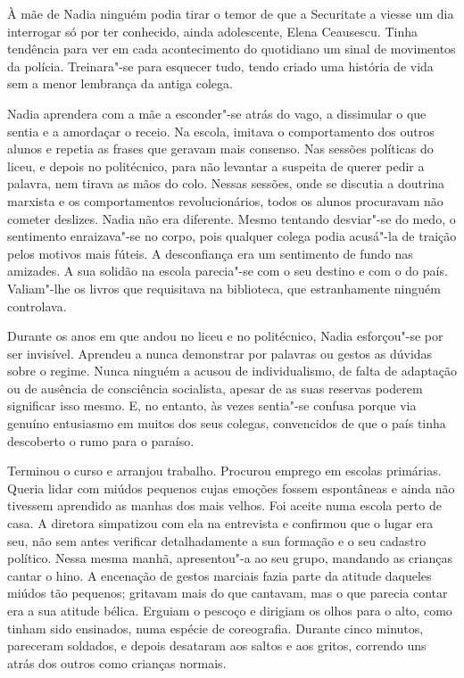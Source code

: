 À mãe de Nadia ninguém podia tirar o temor de que a Securitate a viesse
um dia interrogar só por ter conhecido, ainda adolescente, Elena
Ceausescu. Tinha tendência para ver em cada acontecimento do quotidiano
um sinal de movimentos da polícia. Treinara"-se para esquecer tudo, tendo
criado uma história de vida sem a menor lembrança da antiga colega.

Nadia aprendera com a mãe a esconder"-se atrás do vago, a dissimular o
que sentia e a amordaçar o receio. Na
escola, imitava o comportamento dos outros alunos e repetia as frases
que geravam mais consenso. Nas sessões políticas do liceu, e depois no
politécnico, para não levantar a suspeita de querer pedir a palavra,
nem tirava as mãos do colo. Nessas sessões, onde se discutia a doutrina
marxista e os comportamentos revolucionários, todos os alunos procuravam
não cometer deslizes. Nadia não era diferente. Mesmo tentando desviar"-se
do medo, o sentimento enraizava"-se no corpo, pois qualquer colega
podia acusá"-la de traição pelos motivos mais fúteis. A desconfiança
era um sentimento de fundo nas amizades. A sua solidão na escola
parecia"-se com o seu destino e com o do país. Valiam"-lhe os livros que
requisitava na biblioteca, que estranhamente ninguém controlava.

Durante os anos em que andou no liceu e no politécnico, Nadia esforçou"-se por ser invisível. Aprendeu a nunca demonstrar
por palavras ou gestos as dúvidas sobre o regime. Nunca ninguém a acusou
de individualismo, de falta de adaptação ou de ausência de consciência
socialista, apesar de as suas reservas poderem significar isso mesmo. E,
no entanto, às vezes sentia"-se confusa porque via genuíno entusiasmo em
muitos dos seus colegas, convencidos de que o país tinha descoberto o
rumo para o paraíso.

Terminou o curso e arranjou trabalho. Procurou emprego em escolas
primárias. Queria lidar com miúdos pequenos cujas emoções fossem
espontâneas e ainda não tivessem aprendido as manhas dos mais velhos.
Foi aceite numa escola perto de casa. A diretora simpatizou com ela na
entrevista e confirmou que o lugar era seu, não sem antes verificar
detalhadamente a sua formação e o seu
cadastro político. Nessa mesma manhã, apresentou"-a ao seu grupo,
mandando as crianças cantar o hino. A encenação de gestos marciais
fazia parte da atitude daqueles miúdos tão pequenos; gritavam mais do
que cantavam, mas o que parecia contar era a sua atitude bélica. Erguiam
o pescoço e dirigiam os olhos para o alto, como tinham sido ensinados,
numa espécie de coreografia. Durante cinco minutos, pareceram soldados,
e depois desataram aos saltos e aos gritos, correndo uns atrás dos
outros como crianças normais.

